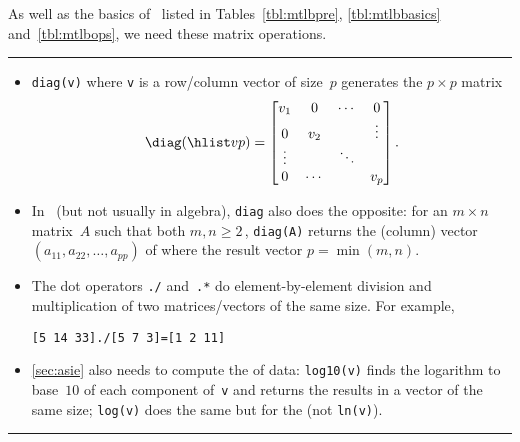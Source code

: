 \begin{table}
\caption{As well as the basics of \script\ listed in Tables~\ref{tbl:mtlbpre}, \ref{tbl:mtlbbasics} and~\ref{tbl:mtlbops},  we need these matrix operations.} \label{tbl:mtlbmops}
\hrule
\begin{minipage}{\linewidth}
\begin{itemize}
\item {}\verb|diag(v)| where \verb|v| is 
a row/column vector of size~\(p\) generates the \(p\times p\) matrix 
\begin{equation*}
\diag(\hlist vp)=\begin{bmatrix} v_1&0&\cdots&0\\
0&v_2&&\vdots\\ \vdots&&\ddots\\ 0&\cdots&&v_p \end{bmatrix}.
\end{equation*}

\item In \script\ (but not usually in algebra), \verb|diag| also does 
the opposite: for an \(m\times n\) matrix~\(A\) such that both 
\(m,n\geq2\)\,,  \verb|diag(A)| returns 
the (column) vector \((a_{11},a_{22},\ldots,a_{pp})\) of 
 where the result vector  \(p=\min(m,n)\).

\item The dot operators \verb|./| and~\verb|.*| do element-by-element division and multiplication of two matrices\slash vectors of the same size.  For example, 
\begin{verbatim}
[5 14 33]./[5 7 3]=[1 2 11]
\end{verbatim}


\item \autoref{sec:asie} also needs to compute the  of data: \verb|log10(v)| finds the logarithm to base~\(10\) of each component of~\verb|v| and returns the results in a vector of the same size; \verb|log(v)| does the same but for the  (not \verb|ln(v)|).

\end{itemize}
\end{minipage}
\hrule
\end{table}




